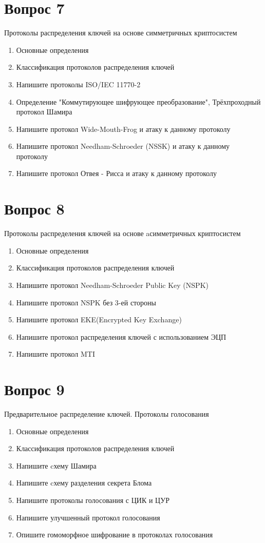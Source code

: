 \documentclass[a4paper,12pt]{article}
\begin{document}
	\section{Вопрос 7}
	Протоколы распределения ключей на основе симметричных криптосистем
	\begin{enumerate}
		\item Основные определения
		\item Классификация протоколов распределения ключей
		\item Напишите протоколы ISO/IEC 11770-2
		\item Определение "Коммутирующее шифрующее преобразование", Трёхпроходный протокол Шамира
		\item Напишите протокол Wide-Mouth-Frog и атаку к данному протоколу
		\item Напишите протокол Needham-Schroeder (NSSK) и атаку к данному протоколу
		\item Напишите протокол Отвея - Рисса и атаку к данному протоколу
	\end{enumerate}
	\newpage
	
	\section{Вопрос 8}
	Протоколы распределения ключей на основе aсимметричных криптосистем
	\begin{enumerate}
		\item Основные определения
		\item Классификация протоколов распределения ключей
		\item Напишите протокол Needham-Schroeder Public Key (NSPK)
		\item Напишите протокол NSPK без 3-ей стороны
		\item Напишите протокол EKE(Encrypted Key Exchange)
		\item Напишите протокол распределения ключей с использованием ЭЦП
		\item Напишите протокол MTI
	\end{enumerate}
	\newpage
	
	\section{Вопрос 9}
	Предварительное распределение ключей. Протоколы голосования
	\begin{enumerate}
		\item Основные определения
		\item Классификация протоколов распределения ключей
		\item Напишите cхему Шамира
		\item Напишите cхему разделения секрета Блома
		\item Напишите протоколы голосования с ЦИК и ЦУР
		\item Напишите улучшенный протокол голосования
		\item Опишите гомоморфное шифрование в протоколах голосования
	\end{enumerate}
	\newpage
	
\end{document}
